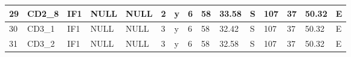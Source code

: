 {\begin{table}[]
\begin{tabular}{|l|l|l|l|l|l|l|l|l|l|l|l|l|l|l|}
		29                                & CD2\_8                                    & IF1                                       & NULL                            & NULL                            & 2                               & y                                    & 6                                                                                    & 58                                                                                   & 33.58                                                                                & S                                                                                 & 107                                                                                   & 37                                                                                    & 50.32                                                                                 & E                                                                                  \\ \hline
		30                                & CD3\_1                                    & IF1                                       & NULL                            & NULL                            & 3                               & y                                    & 6                                                                                    & 58                                                                                   & 32.42                                                                                & S                                                                                 & 107                                                                                   & 37                                                                                    & 50.32                                                                                 & E                                                                                  \\ \hline
		31                                & CD3\_2                                    & IF1                                       & NULL                            & NULL                            & 3                               & y                                    & 6                                                                                    & 58                                                                                   & 32.58                                                                                & S                                                                                 & 107                                                                                   & 37                                                                                    & 50.32                                                                                 & E                                                                                  \\ \hline

\end{tabular}
\end{table}}
